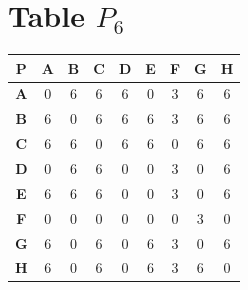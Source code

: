\documentclass{article}
\begin{document}
\section{Table $P_{6}$}
\begin{center}
    \begin{tabular}{|c||c|c|c|c|c|c|c|c|}
        \hline
        \textbf{P} & \textbf{A} & \textbf{B} & \textbf{C} & \textbf{D} & \textbf{E} & \textbf{F} & \textbf{G} & \textbf{H} \\
        \hline
        \hline
        \textbf{A}& 0 & \cellcolor[HTML]{D74894}$6$ & \cellcolor[HTML]{D74894}$6$ & \cellcolor[HTML]{D74894}$6$ & 0 & 3 & \cellcolor[HTML]{D74894}$6$ & \cellcolor[HTML]{D74894}$6$ \\
        \hline
        \textbf{B}& \cellcolor[HTML]{D74894}$6$ & 0 & \cellcolor[HTML]{D74894}$6$ & \cellcolor[HTML]{D74894}$6$ & \cellcolor[HTML]{D74894}$6$ & 3 & \cellcolor[HTML]{D74894}$6$ & \cellcolor[HTML]{D74894}$6$ \\
        \hline
        \textbf{C}& \cellcolor[HTML]{D74894}$6$ & \cellcolor[HTML]{D74894}$6$ & 0 & \cellcolor[HTML]{D74894}$6$ & \cellcolor[HTML]{D74894}$6$ & 0 & \cellcolor[HTML]{D74894}$6$ & \cellcolor[HTML]{D74894}$6$ \\
        \hline
        \textbf{D}& 0 & \cellcolor[HTML]{D74894}$6$ & \cellcolor[HTML]{D74894}$6$ & 0 & 0 & 3 & 0 & \cellcolor[HTML]{D74894}$6$ \\
        \hline
        \textbf{E}& \cellcolor[HTML]{D74894}$6$ & \cellcolor[HTML]{D74894}$6$ & \cellcolor[HTML]{D74894}$6$ & 0 & 0 & 3 & 0 & \cellcolor[HTML]{D74894}$6$ \\
        \hline
        \textbf{F}& 0 & 0 & 0 & 0 & 0 & 0 & 3 & 0 \\
        \hline
        \textbf{G}& \cellcolor[HTML]{D74894}$6$ & 0 & \cellcolor[HTML]{D74894}$6$ & 0 & \cellcolor[HTML]{D74894}$6$ & 3 & 0 & \cellcolor[HTML]{D74894}$6$ \\
        \hline
        \textbf{H}& \cellcolor[HTML]{D74894}$6$ & 0 & \cellcolor[HTML]{D74894}$6$ & 0 & \cellcolor[HTML]{D74894}$6$ & 3 & \cellcolor[HTML]{D74894}$6$ & 0 \\
        \hline
    \end{tabular}
\end{center}
\end{document}
